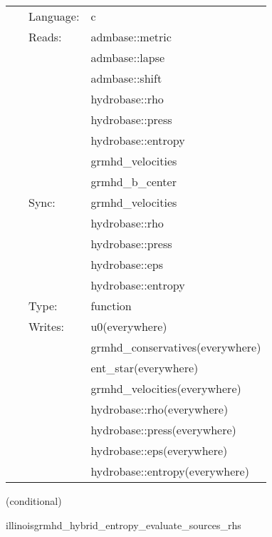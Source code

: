 \documentclass{article}
\begin{document}
 \begin{tabular*}{160mm}{cll} 
~ & Language:  & c \\ 
~ & Reads:  & admbase::metric \\ 
~& ~ &admbase::lapse\\ 
~& ~ &admbase::shift\\ 
~& ~ &hydrobase::rho\\ 
~& ~ &hydrobase::press\\ 
~& ~ &hydrobase::entropy\\ 
~& ~ &grmhd\_velocities\\ 
~& ~ &grmhd\_b\_center\\ 
~ & Sync:  & grmhd\_velocities \\ 
~& ~ &hydrobase::rho\\ 
~& ~ &hydrobase::press\\ 
~& ~ &hydrobase::eps\\ 
~& ~ &hydrobase::entropy\\ 
~ & Type:  & function \\ 
~ & Writes:  & u0(everywhere) \\ 
~& ~ &grmhd\_conservatives(everywhere)\\ 
~& ~ &ent\_star(everywhere)\\ 
~& ~ &grmhd\_velocities(everywhere)\\ 
~& ~ &hydrobase::rho(everywhere)\\ 
~& ~ &hydrobase::press(everywhere)\\ 
~& ~ &hydrobase::eps(everywhere)\\ 
~& ~ &hydrobase::entropy(everywhere)\\ 
\end{tabular*} 


\vspace{5mm}

   (conditional) 

\hspace{5mm} illinoisgrmhd\_hybrid\_entropy\_evaluate\_sources\_rhs 

\hspace{5mm}{\it entropy+hybrid version of illinoisgrmhd\_evaluate\_sources\_rhs } 


\hspace{5mm}
\end{document}
